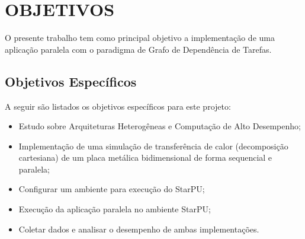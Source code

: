 
\chapter{OBJETIVOS}
\label{chap:objetivos}

O presente trabalho tem como principal objetivo a implementação de uma aplicação paralela com o paradigma de Grafo de Dependência de Tarefas.

\section{Objetivos Específicos}

A seguir são listados os objetivos específicos para este projeto:\\

\begin{itemize}
    \item Estudo sobre Arquiteturas Heterogêneas e Computação de Alto Desempenho;
    \item Implementação de uma simulação de transferência de calor (decomposição cartesiana) de um placa metálica bidimensional de forma sequencial e paralela;
    \item Configurar um ambiente para execução do StarPU;
    \item Execução da aplicação paralela no ambiente StarPU;
    \item Coletar dados e analisar o desempenho de ambas implementações.
\end{itemize}